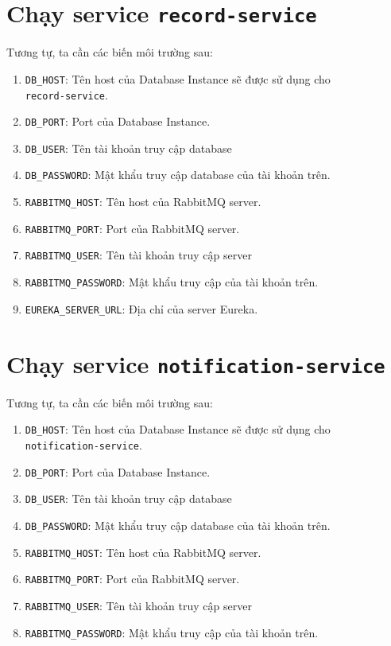 \section{Chạy service \texttt{record-service}}
Tương tự, ta cần các biến môi trường sau:
\begin{enumerate}
    \item \texttt{DB\_HOST}: Tên host của Database Instance sẽ được sử dụng cho \\
    \texttt{record-service}.
    \item \texttt{DB\_PORT}: Port của Database Instance.
    \item \texttt{DB\_USER}: Tên tài khoản truy cập database
    \item \texttt{DB\_PASSWORD}: Mật khẩu truy cập database của tài khoản trên.
    \item \texttt{RABBITMQ\_HOST}: Tên host của RabbitMQ server.
    \item \texttt{RABBITMQ\_PORT}: Port của RabbitMQ server.
    \item \texttt{RABBITMQ\_USER}: Tên tài khoản truy cập server
    \item \texttt{RABBITMQ\_PASSWORD}: Mật khẩu truy cập của tài khoản trên.
    \item \texttt{EUREKA\_SERVER\_URL}: Địa chỉ của server Eureka.
\end{enumerate}

\section{Chạy service \texttt{notification-service}}
Tương tự, ta cần các biến môi trường sau:
\begin{enumerate}
    \item \texttt{DB\_HOST}: Tên host của Database Instance sẽ được sử dụng cho \\
    \texttt{notification-service}.
    \item \texttt{DB\_PORT}: Port của Database Instance.
    \item \texttt{DB\_USER}: Tên tài khoản truy cập database
    \item \texttt{DB\_PASSWORD}: Mật khẩu truy cập database của tài khoản trên.
    \item \texttt{RABBITMQ\_HOST}: Tên host của RabbitMQ server.
    \item \texttt{RABBITMQ\_PORT}: Port của RabbitMQ server.
    \item \texttt{RABBITMQ\_USER}: Tên tài khoản truy cập server
    \item \texttt{RABBITMQ\_PASSWORD}: Mật khẩu truy cập của tài khoản trên.
\end{enumerate}

